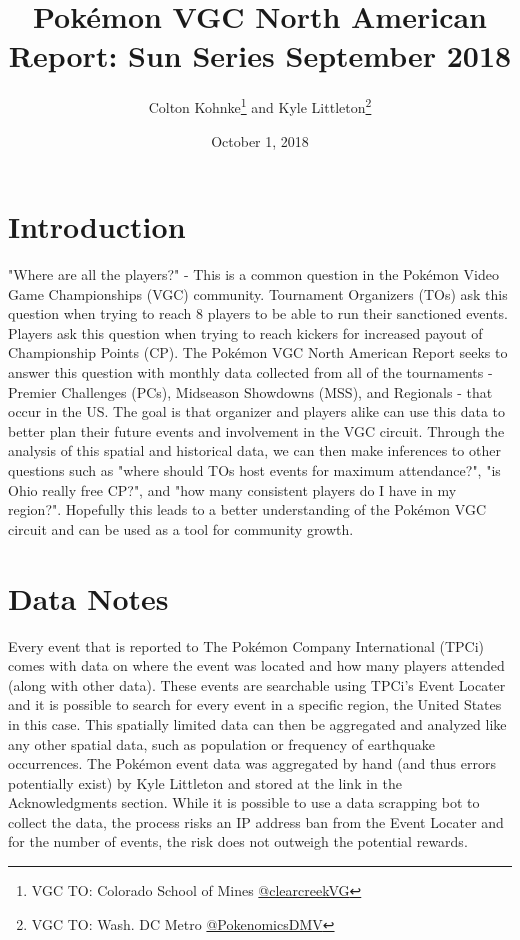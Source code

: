 \documentclass[11pt,twocolumn]{article}
\title{Pokémon VGC North American Report: Sun Series September 2018}
\author{Colton Kohnke\thanks{VGC TO: Colorado School of Mines \href{https://twitter.com/clearcreekVG}{@clearcreekVG}} and Kyle Littleton\thanks{VGC TO: Wash. DC Metro \href{https://twitter.com/PokenomicsDMV}{@PokenomicsDMV}}}
\date{October 1, 2018}
\begin{document}
\maketitle

\section*{Introduction}

"Where are all the players?" - This is a common question in the Pokémon Video Game Championships (VGC) community. Tournament Organizers (TOs) ask this question when trying to reach 8 players to be able to run their sanctioned events. Players ask this question when trying to reach kickers for increased payout of Championship Points (CP). The Pokémon VGC North American Report seeks to answer this question with monthly data collected from all of the tournaments - Premier Challenges (PCs), Midseason Showdowns (MSS), and Regionals - that occur in the US. The goal is that organizer and players alike can use this data to better plan their future events and involvement in the VGC circuit. Through the analysis of this spatial and historical data, we can then make inferences to other questions such as "where should TOs host events for maximum attendance?", "is Ohio really free CP?", and "how many consistent players do I have in my region?". Hopefully this leads to a better understanding of the Pokémon VGC circuit and can be used as a tool for community growth.

\section*{Data Notes}

Every event that is reported to The Pokémon Company International (TPCi) comes with data on where the event was located and how many players attended (along with other data). These events are searchable using TPCi's Event Locater and it is possible to search for every event in a specific region, the United States in this case. This spatially limited data can then be aggregated and analyzed like any other spatial data, such as population or frequency of earthquake occurrences. The Pokémon event data was aggregated by hand (and thus errors potentially exist) by Kyle Littleton and stored at the link in the Acknowledgments section. While it is possible to use a data scrapping bot to collect the data, the process risks an IP address ban from the Event Locater and for the number of events, the risk does not outweigh the potential rewards. 
\end{document}
